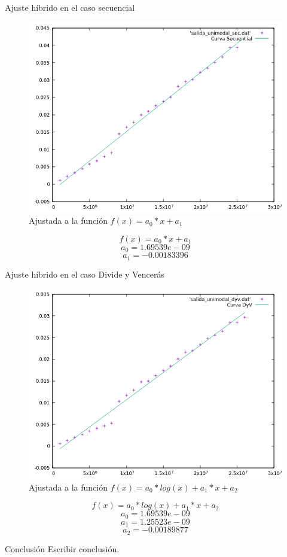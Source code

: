 \documentclass[12pt]{beamer}
\begin{document}
\begin{frame}{Ajuste híbrido en el caso secuencial}

\begin{figure}[H] 
\centering
\includegraphics[angle=0,scale=0.5]{img/AjusteHibridoSec.png} 
\caption{Ajustada a la función $f(x)=a_0*x+a_1$} 
\end{figure}

\end{frame}

\begin{frame}
\[
f(x)=a_0*x+a_1 
\]
\[
a_0=1.69539e-09
\]
\[
a_1=-0.00183396
\]
\end{frame}

\begin{frame}{Ajuste híbrido en el caso Divide y Vencerás}

\begin{figure}[H] 
\centering
\includegraphics[angle=0,scale=0.5]{img/AjusteHibridoDyV.png} 
\caption{Ajustada a la función $f(x)=a_0*log(x)+a_1*x+a_2$} 
\end{figure}

\end{frame}

\begin{frame}
\[
f(x)=a_0*log(x)+a_1*x+a_2
\]
\[
a_0=1.69539e-09
\]
\[
a_1=1.25523e-09
\]
\[
a_2=-0.00189877
\]
\end{frame}

\begin{frame}{Conclusión}
Escribir conclusión.
\end{frame}
\end{document}
